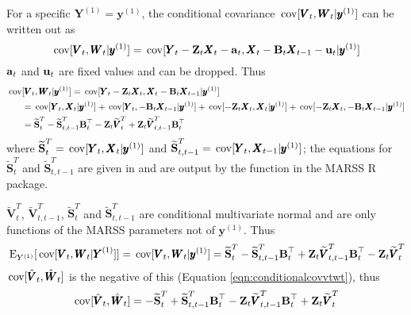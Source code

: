 \documentclass[]{article}
\def\UPS{\mbox{\boldmath $\Upsilon$}}
\def\XI{\mbox{\boldmath $\Xi$}}
\def\BB{\mbox{$\mathbf B$}}	\def\bb{\mbox{$\mathbf b$}} \def\Bb{\mbox{$\mathbf J$}} \def\Ba{\mbox{$\mathbf L$}} \def\Bm{\UPS}
\def\E{\,\textup{\textrm{E}}}
\def\Ss{\mbox{$\mathbf S$}}
\def\VV{\mbox{$\pmb{V}$}}	\def\vv{\mbox{$\pmb{v}$}}
\def\WW{\mbox{$\pmb{W}$}}	\def\ww{\mbox{$\pmb{w}$}}
\def\XX{\mbox{$\pmb{X}$}}	\def\xx{\mbox{$\pmb{x}$}}
\def\YY{\mbox{$\pmb{Y}$}}	\def\yy{\mbox{$\pmb{y}$}}
\def\ZZ{\mbox{$\mathbf Z$}}	\def\zz{\mbox{$\mathbf z$}}	\def\Zb{\mbox{$\mathbf M$}} \def\Za{\mbox{$\mathbf N$}} \def\Zm{\XI}
\def\cov{\,\textup{\textrm{cov}}}
\def\hatVt{\widetilde{\VV}_t^T}
\def\hatVttm{\widetilde{\VV}_{t,t-1}^T}
\def\hatSt{\widetilde{\Ss}_t^T}
\def\hatSttm{\widetilde{\Ss}_t^{t-1}}
\def\hatSttm{\widetilde{\Ss}_{t,t-1}^T}
\begin{document}
For a specific $\YY^{(1)}=\yy^{(1)}$, the conditional covariance $\cov[\VV_t, \WW_t|\yy^{(1)}]$ can be written out as
\begin{equation}
\cov[\VV_t, \WW_t|\yy^{(1)}] = \cov[\YY_t-\ZZ_t\XX_t-\aa_t, \XX_t-\BB_t\XX_{t-1}-\uu_t|\yy^{(1)}]
\end{equation}
$\aa_t$ and $\uu_t$ are fixed values and can be dropped. Thus
\begin{equation}
\begin{split}
\cov&[\VV_t, \WW_t|\yy^{(1)}] =\cov[\YY_t-\ZZ_t\XX_t, \XX_t-\BB_t\XX_{t-1}|\yy^{(1)}] \\
& =\cov[\YY_t,\XX_t|\yy^{(1)}] + \cov[\YY_t,-\BB_t\XX_{t-1}|\yy^{(1)}] + \cov[-\ZZ_t\XX_t,\XX_t|\yy^{(1)}] + \cov[-\ZZ_t\XX_t,-\BB_t\XX_{t-1}|\yy^{(1)}]\\
& = \hatSt - \hatSttm\BB_t^\top - \ZZ_t\hatVt + \ZZ_t\hatVttm\BB_t^\top
\end{split}
\end{equation}
where $\hatSt=\cov[\YY_t,\XX_t|\yy^{(1)}]$ and $\hatSttm=\cov[\YY_t,\XX_{t-1}|\yy^{(1)}]$; the equations for $\hatSt$ and $\hatSttm$ are given in \citet{Holmes2010} and are output by the \verb@MARSShatyt@ function in the MARSS R package.

$\hatVt$, $\hatVttm$, $\hatSt$ and $\hatSttm$ are conditional multivariate normal and are only functions of the MARSS parameters not of $\yy^{(1)}$. Thus 
\begin{equation}
\E_{Y^{(1)}}[ \cov[\VV_t, \WW_t|\YY^{(1)}] ]= \cov[\VV_t, \WW_t|\yy^{(1)}] = \hatSt - \hatSttm\BB_t^\top + \ZZ_t\hatVttm\BB_t^\top - \ZZ_t\hatVt
\end{equation}
$\cov[\hat{\VV}_t,\hat{\WW}_t]$ is the negative of this (Equation \ref{eqn:conditionalcovvtwt}), thus
\begin{equation}
\cov[\hat{\VV}_t,\hat{\WW}_t] = - \hatSt + \hatSttm\BB_t^\top - \ZZ_t\hatVttm\BB_t^\top + \ZZ_t\hatVt
\end{equation}
\end{document}
